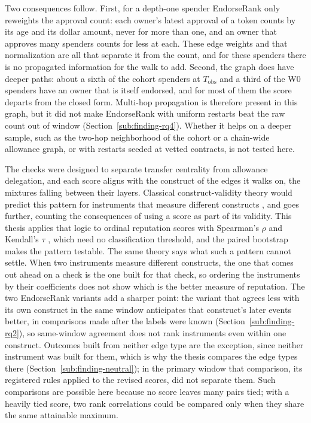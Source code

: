 Two consequences follow. First, for a depth-one spender EndorseRank only reweights the approval count: each owner's latest approval of a token counts by its age and its dollar amount, never for more than one, and an owner that approves many spenders counts for less at each. These edge weights and that normalization are all that separate it from the count, and for these spenders there is no propagated information for the walk to add. Second, the graph does have deeper paths: about a sixth of the cohort spenders at $T_{\mathrm{obs}}$ and a third of the W0 spenders have an owner that is itself endorsed, and for most of them the score departs from the closed form. Multi-hop propagation is therefore present in this graph, but it did not make EndorseRank with uniform restarts beat the raw count out of window (Section~\ref{sub:finding-rq4}). Whether it helps on a deeper sample, such as the two-hop neighborhood of the cohort or a chain-wide allowance graph, or with restarts seeded at vetted contracts, is not tested here.


The checks were designed to separate transfer centrality from allowance delegation, and each score aligns with the construct of the edges it walks on, the mixtures falling between their layers. Classical construct-validity theory would predict this pattern for instruments that measure different constructs \parencite{cronbach1955construct}, and \textcite{messick1995validity} goes further, counting the consequences of using a score as part of its validity. This thesis applies that logic to ordinal reputation scores with Spearman's $\rho$ \parencite{spearman1904proof} and Kendall's $\tau$ \parencite{kendall1938rank}, which need no classification threshold, and the paired bootstrap \parencite{efron1979bootstrap} makes the pattern testable. The same theory says what such a pattern cannot settle. When two instruments measure different constructs, the one that comes out ahead on a check is the one built for that check, so ordering the instruments by their coefficients does not show which is the better measure of reputation. The two EndorseRank variants add a sharper point: the variant that agrees less with its own construct in the same window anticipates that construct's later events better, in comparisons made after the labels were known (Section~\ref{sub:finding-rq2}), so same-window agreement does not rank instruments even within one construct. Outcomes built from neither edge type are the exception, since neither instrument was built for them, which is why the thesis compares the edge types there (Section~\ref{sub:finding-neutral}); in the primary window that comparison, its registered rules applied to the revised scores, did not separate them. Such comparisons are possible here because no score leaves many pairs tied; with a heavily tied score, two rank correlations could be compared only when they share the same attainable maximum.

